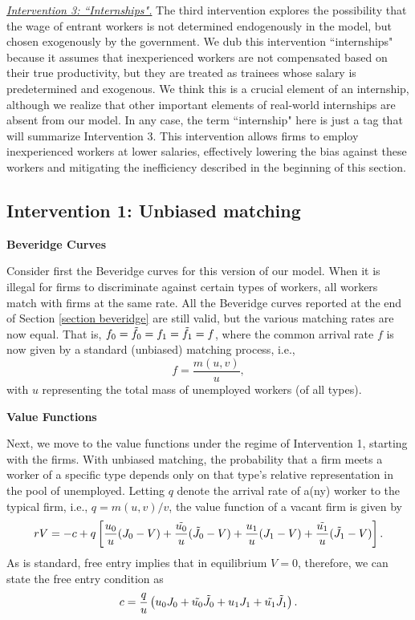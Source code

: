 \documentclass[12pt]{article} %
\theoremstyle{definition}
\begin{document}
\medskip

\underline{\textit{Intervention 3: ``Internships".}} The third intervention explores the possibility that the wage of entrant workers is not determined endogenously in the model, but chosen exogenously by the government. We dub this intervention ``internships" because it assumes that inexperienced workers are not compensated based on their true productivity, but they are treated as trainees whose salary is predetermined and exogenous. We think this is a crucial element of an internship, although we realize that other important elements of real-world internships are absent from our model. In any case, the term ``internship" here is just a tag that will summarize Intervention 3. This intervention allows firms to employ inexperienced workers at lower salaries, effectively lowering the bias against these workers and mitigating the inefficiency described in the beginning of this section.  



\subsection{Intervention 1: Unbiased matching}\label{section unbiased matching}

\textbf{Beveridge Curves} 

\noindent Consider first the Beveridge curves for this version of our model. When it is illegal for firms to discriminate against certain types of workers, all workers match with firms at the same rate. All the Beveridge curves reported at the end of Section \ref{section beveridge} are still valid, but the various matching rates are now equal. That is, $f_0=\Tilde{f_0}=f_1=\Tilde{f_1}=f$, where the common arrival rate $f$ is now given by a standard (unbiased) matching process, i.e., 
\begin{equation}
f=\frac{m(u,v)}{u},\label{eq definition of common f} 
\end{equation}with $u$ representing the total mass of unemployed workers (of all types). 


\bigskip 

\noindent \textbf{Value Functions}

\noindent Next, we move to the value functions under the regime of Intervention 1, starting with the firms. With unbiased matching, the probability that a firm meets a worker of a specific type depends only on that type's relative representation in the pool of unemployed. Letting $q$ denote the arrival rate of a(ny) worker to the typical firm, i.e., $q=m(u,v)/v$, the value function of a vacant firm is given by 
\begin{equation}
   rV = -c + q \left[\frac{u_0}{u}(J_0-V) + \frac{\Tilde{u_0}}{u}(\Tilde{J_0}-V) + \frac{u_1}{u}(J_1-V) +  \frac{\Tilde{u_1}}{u}(\Tilde{J_1}-V) \right].\nonumber 
\end{equation}As is standard, free entry implies that in equilibrium $V=0$, therefore, we can state the free entry condition as 
\begin{equation}
 c = \frac{q}{u} \left({u_0} J_0 + \Tilde{u_0} \Tilde{J_0} + {u_1} J_1 +  \Tilde{u_1} \Tilde{J_1} \right).\label{eq free entry intervention 1} 
\end{equation}
\end{document}
